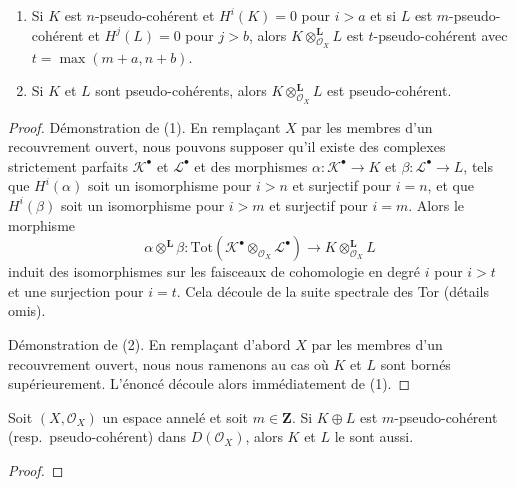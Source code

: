 {\begin{lemma}
\begin{enumerate}

\item Si $K$ est $n$-pseudo-cohérent et $H^i(K) = 0$ pour $i > a$
et si $L$ est $m$-pseudo-cohérent et $H^j(L) = 0$ pour $j > b$, alors
$K \otimes_{\mathcal{O}_X}^\mathbf{L} L$ est $t$-pseudo-cohérent avec $t = \max(m + a, n + b)$.
\item Si $K$ et $L$ sont pseudo-cohérents, alors
$K \otimes_{\mathcal{O}_X}^\mathbf{L} L$ est pseudo-cohérent.

\end{enumerate}

\end{lemma}

\begin{proof}
Démonstration de (1). En remplaçant $X$ par les membres d'un recouvrement ouvert, nous pouvons supposer qu'il existe des complexes strictement parfaits $\mathcal{K}^\bullet$ et $\mathcal{L}^\bullet$ et des morphismes $\alpha : \mathcal{K}^\bullet \to K$ et $\beta : \mathcal{L}^\bullet \to L$, tels que $H^i(\alpha)$ soit un isomorphisme pour $i > n$ et surjectif pour $i = n$, et que $H^i(\beta)$ soit un isomorphisme pour $i > m$ et surjectif pour $i = m$. Alors le morphisme $$
\alpha \otimes^\mathbf{L} \beta :
\text{Tot}(\mathcal{K}^\bullet \otimes_{\mathcal{O}_X} \mathcal{L}^\bullet)
\to K \otimes_{\mathcal{O}_X}^\mathbf{L} L
$$ induit des isomorphismes sur les faisceaux de cohomologie en degré $i$ pour $i > t$ et une surjection pour $i = t$. Cela découle de la suite spectrale des Tor (détails omis).

\medskip\noindent

Démonstration de (2). En remplaçant d'abord $X$ par les membres d'un recouvrement ouvert, nous nous ramenons au cas où $K$ et $L$ sont bornés supérieurement. L'énoncé découle alors immédiatement de (1).

\end{proof}

\begin{lemma}

\label{lemma-summands-pseudo-coherent}
Soit $(X, \mathcal{O}_X)$ un espace annelé et soit $m \in \mathbf{Z}$. Si $K \oplus L$ est $m$-pseudo-cohérent (resp.\ pseudo-cohérent) dans $D(\mathcal{O}_X)$, alors $K$ et $L$ le sont aussi.
\end{lemma}

\begin{proof}


\end{proof}}
